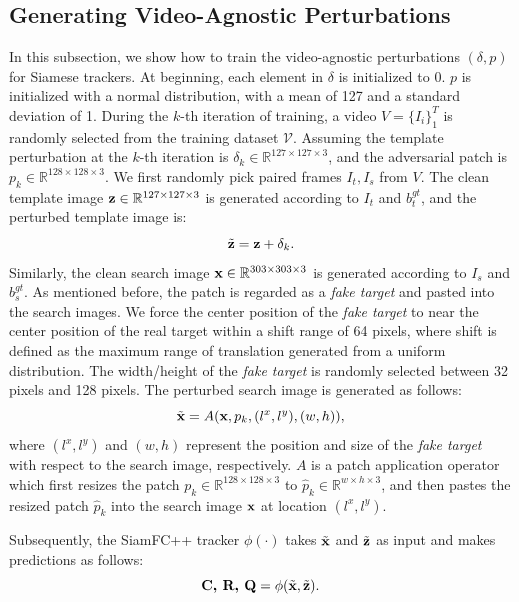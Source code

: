 \documentclass[journal]{IEEEtran}
\begin{document}
\subsection{Generating Video-Agnostic Perturbations}

In this subsection, we show how to train the video-agnostic perturbations $(\delta, p)$ for Siamese trackers.
At beginning, each element in $\delta$ is initialized to 0.
$p$ is initialized with a normal distribution, with a mean of 127 and a standard deviation of 1.
During the $k$-th iteration of training, a video $V=\{I_i\}_1^T$ is randomly selected from the training dataset $\mathcal V$. Assuming the template perturbation at the $k$-th iteration is $\delta_k \in \mathbb{R}^{127\times 127 \times 3}$, and the adversarial patch is $p_k \in \mathbb{R}^{128\times 128\times 3}$. We first randomly pick paired frames $I_t, I_s$ from $V$.
The clean template image $\textbf z\in \mathbb{R}^{127\times 127 \times 3}$ is generated according to $I_t$ and $b^{gt}_t$, and the perturbed template image is:
\begin{equation}
\tilde {\textbf z} = \textbf z + \delta_k.
\end{equation}
Similarly, the clean search image $\textbf x \in \mathbb{R}^{303\times 303 \times 3}$ is generated according to $I_s$ and $b^{gt}_s$.
As mentioned before, the patch is regarded as a \textit{fake target} and pasted into the search images. We force the center position of the \textit{fake target} to near the center position of the real target within a shift range of 64 pixels, where shift is defined as the maximum range of translation generated from a uniform distribution.
The width/height of the \textit{fake target} is randomly selected between 32 pixels and 128 pixels.
The perturbed search image is generated as follows:
\begin{equation}
\tilde{\textbf x} = A(\textbf x, p_k, (l^x, l^y), (w, h)),
\end{equation}
where $(l^x, l^y)$ and $(w, h)$ represent the position and size of the \textit{fake target} with respect to the search image, respectively. $A$ is a patch application operator \cite{patch} which first resizes the patch $p_k \in \mathbb{R}^{128\times 128\times 3}$ to $\hat{p}_k \in \mathbb{R}^{w\times h\times 3}$, and then pastes the resized patch $\hat{p}_k$ into the search image $\textbf x$ at location $(l^x,l^y)$.

Subsequently, the SiamFC++ tracker $\phi(\cdot)$ takes $\tilde {\textbf x}$ and $\tilde{\textbf  z}$ as input and makes predictions as follows:
\begin{equation}
\textbf{C, R, Q} = \phi(\tilde {\textbf x}, \tilde{\textbf z}).
\end{equation}
\end{document}

